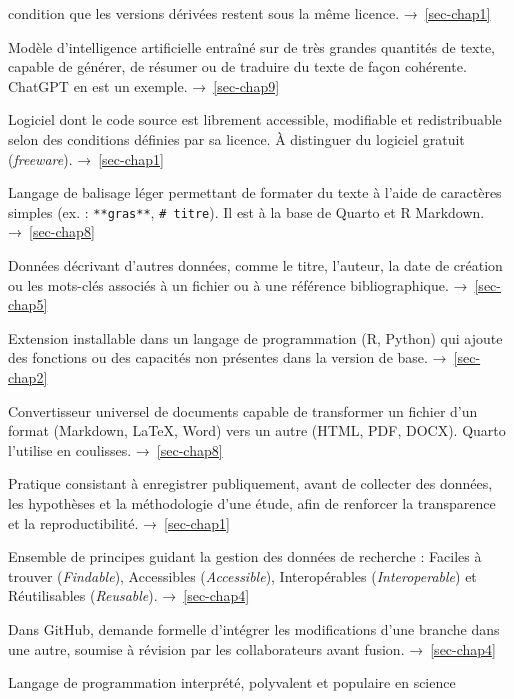 \documentclass[
  letterpaper,
  DIV=11,
  numbers=noendperiod,
  oneside]{scrreprt}
\begin{document}
\begin{description}
condition que les versions dérivées restent sous la même licence.
→~\ref{sec-chap1}
\item[\textbf{LLM} \emph{(Large Language Model)}]
Modèle d'intelligence artificielle entraîné sur de très grandes
quantités de texte, capable de générer, de résumer ou de traduire du
texte de façon cohérente. ChatGPT en est un exemple. →~\ref{sec-chap9}
\item[\textbf{Logiciel libre}]
Logiciel dont le code source est librement accessible, modifiable et
redistribuable selon des conditions définies par sa licence. À
distinguer du logiciel gratuit (\emph{freeware}). →~\ref{sec-chap1}
\item[\textbf{Markdown}]
Langage de balisage léger permettant de formater du texte à l'aide de
caractères simples (ex. : \texttt{**gras**}, \texttt{\#\ titre}). Il est
à la base de Quarto et R Markdown. →~\ref{sec-chap8}
\item[\textbf{Métadonnées}]
Données décrivant d'autres données, comme le titre, l'auteur, la date de
création ou les mots-clés associés à un fichier ou à une référence
bibliographique. →~\ref{sec-chap5}
\item[\textbf{Package}]
Extension installable dans un langage de programmation (R, Python) qui
ajoute des fonctions ou des capacités non présentes dans la version de
base. →~\ref{sec-chap2}
\item[\textbf{Pandoc}]
Convertisseur universel de documents capable de transformer un fichier
d'un format (Markdown, LaTeX, Word) vers un autre (HTML, PDF, DOCX).
Quarto l'utilise en coulisses. →~\ref{sec-chap8}
\item[\textbf{Préinscription} \emph{(preregistration)}]
Pratique consistant à enregistrer publiquement, avant de collecter des
données, les hypothèses et la méthodologie d'une étude, afin de
renforcer la transparence et la reproductibilité. →~\ref{sec-chap1}
\item[\textbf{Principe FAIR}]
Ensemble de principes guidant la gestion des données de recherche :
Faciles à trouver (\emph{Findable}), Accessibles (\emph{Accessible}),
Interopérables (\emph{Interoperable}) et Réutilisables
(\emph{Reusable}). →~\ref{sec-chap4}
\item[\textbf{Pull request}]
Dans GitHub, demande formelle d'intégrer les modifications d'une branche
dans une autre, soumise à révision par les collaborateurs avant fusion.
→~\ref{sec-chap4}
\item[\textbf{Python}]
Langage de programmation interprété, polyvalent et populaire en science

\end{description}
\end{document}

